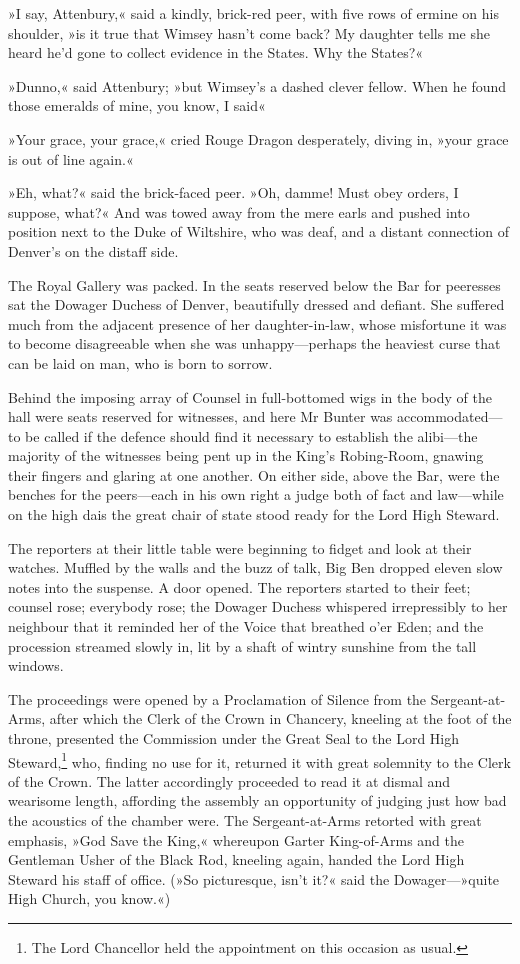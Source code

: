 »I say, Attenbury,« said a kindly, brick-red peer, with five rows of ermine on his shoulder, »is it true that Wimsey hasn't come back?  My daughter tells me she heard he'd gone to collect evidence in the States. Why the States?«

»Dunno,« said Attenbury; »but Wimsey's a dashed clever fellow. When he found those emeralds of mine, you know, I said\longdash«

»Your grace, your grace,« cried Rouge Dragon desperately, diving in, »your grace is out of line again.«

»Eh, what?« said the brick-faced peer. »Oh, damme! Must obey orders, I suppose, what?« And was towed away from the mere earls and pushed into position next to the Duke of Wiltshire, who was deaf, and a distant connection of Denver's on the distaff side.

The Royal Gallery was packed. In the seats reserved below the Bar for peeresses sat the Dowager Duchess of Denver, beautifully dressed and defiant. She suffered much from the adjacent presence of her daughter-in-law, whose misfortune it was to become disagreeable when she was unhappy—perhaps the heaviest curse that can be laid on man, who is born to sorrow.

Behind the imposing array of Counsel in full-bottomed wigs in the body of the hall were seats reserved for witnesses, and here Mr Bunter was accommodated—to be called if the defence should find it necessary to establish the alibi—the majority of the witnesses being pent up in the King's Robing-Room, gnawing their fingers and glaring at one another.  On either side, above the Bar, were the benches for the peers—each in his own right a judge both of fact and law—while on the high dais the great chair of state stood ready for the Lord High Steward.

The reporters at their little table were beginning to fidget and look at their watches. Muffled by the walls and the buzz of talk, Big Ben dropped eleven slow notes into the suspense. A door opened.  The reporters started to their feet; counsel rose; everybody rose; the Dowager Duchess whispered irrepressibly to her neighbour that it reminded her of the Voice that breathed o'er Eden; and the procession streamed slowly in, lit by a shaft of wintry sunshine from the tall windows.

The proceedings were opened by a Proclamation of Silence from the Sergeant-at-Arms, after which the Clerk of the Crown in Chancery, kneeling at the foot of the throne, presented the Commission under the Great Seal to the Lord High Steward,\footnote{The Lord Chancellor held the appointment on this occasion as usual.} who, finding no use for it, returned it with great solemnity to the Clerk of the Crown. The latter accordingly proceeded to read it at dismal and wearisome length, affording the assembly an opportunity of judging just how bad the acoustics of the chamber were. The Sergeant-at-Arms retorted with great emphasis, »God Save the King,« whereupon Garter King-of-Arms and the Gentleman Usher of the Black Rod, kneeling again, handed the Lord High Steward his staff of office. (»So picturesque, isn't it?« said the Dowager—»quite High Church, you know.«)

